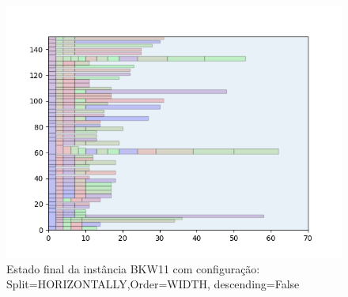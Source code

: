 \begin{figure}[H]
    \centering
    \caption[]{Estado final da instância BKW11 com configuração: Split=HORIZONTALLY,Order=WIDTH, descending=False}
    \label{fig:bkw11-horizontally-width-false}
    \includegraphics[scale=0.5]{output/figures/bkw/bkw11/horizontally/width/false/000}
\end{figure}